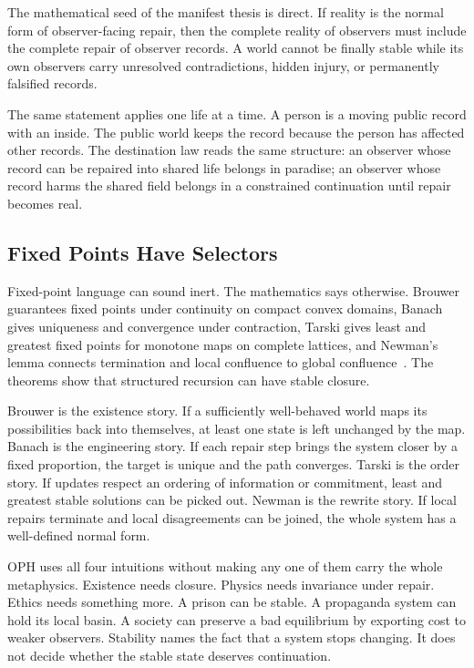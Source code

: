 \documentclass[11pt]{article}
\theoremstyle{remark}
\theoremstyle{plain}
\begin{document}
The mathematical seed of the manifest thesis is direct. If reality is the normal
form of observer-facing repair, then the complete reality of observers must
include the complete repair of observer records. A world cannot be finally
stable while its own observers carry unresolved contradictions, hidden injury,
or permanently falsified records.

The same statement applies one life at a time. A person is a moving public
record with an inside. The public world keeps the record because the person has
affected other records. The destination law reads the same structure: an
observer whose record can be repaired into shared life belongs in paradise; an
observer whose record harms the shared field belongs in a constrained
continuation until repair becomes real.

\subsection{Fixed Points Have Selectors}

Fixed-point language can sound inert. The mathematics says otherwise. Brouwer guarantees fixed
points under continuity on compact convex domains, Banach gives uniqueness and
convergence under contraction, Tarski gives least and greatest fixed points for
monotone maps on complete lattices, and Newman's lemma connects termination and
local confluence to global confluence~\cite{Brouwer1912,Banach1922,Tarski1955,Newman1942}.
The theorems show that structured recursion can have stable closure.

Brouwer is the existence story. If a sufficiently well-behaved world maps its
possibilities back into themselves, at least one state is left unchanged by the
map. Banach is the engineering story. If each repair step brings the system
closer by a fixed proportion, the target is unique and the path converges.
Tarski is the order story. If updates respect an ordering of information or
commitment, least and greatest stable solutions can be picked out. Newman is the
rewrite story. If local repairs terminate and local disagreements can be joined,
the whole system has a well-defined normal form.

OPH uses all four intuitions without making any one of them carry the whole
metaphysics. Existence needs closure. Physics needs invariance under repair.
Ethics needs something more. A prison can be stable. A propaganda system can
hold its local basin. A society can preserve a bad equilibrium by exporting cost
to weaker observers. Stability names the fact that a system stops changing. It
does not decide whether the stable state deserves continuation.
\end{document}
